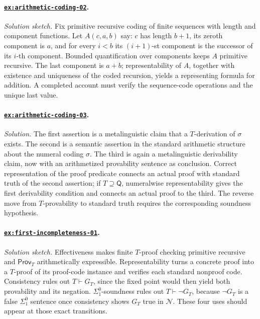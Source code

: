 \documentclass[11pt,oneside,openany]{book}
\theoremstyle{definition}
\theoremstyle{plain}
\theoremstyle{remark}
\newcommand{\derives}{\vdash}
\begin{document}
\paragraph{\hyperref[ex:arithmetic-coding-02]{\texttt{ex:arithmetic-coding-02}}.}
\textit{Solution sketch.}  Fix primitive recursive coding of finite sequences
with length and component functions.  Let \(A(c,a,b)\) say: \(c\) has length
\(b+1\), its zeroth component is \(a\), and for every \(i<b\) its
\((i+1)\)-st component is the successor of its \(i\)-th component.  Bounded
quantification over components keeps \(A\) primitive recursive.  The last
component is \(a+b\); representability of \(A\), together with existence and
uniqueness of the coded recursion, yields a representing formula for addition.
A completed account must verify the sequence-code operations and the unique
last value.

\paragraph{\hyperref[ex:arithmetic-coding-03]{\texttt{ex:arithmetic-coding-03}}.}
\textit{Solution.}  The first assertion is a metalinguistic claim that a
\(T\)-derivation of \(\sigma\) exists.  The second is a semantic assertion in
the standard arithmetic structure about the numeral coding \(\sigma\).  The
third is again a metalinguistic derivability claim, now with an arithmetized
provability sentence as conclusion.  Correct representation of the proof
predicate connects an actual proof with standard truth of the second assertion;
if \(T\supseteq\mathsf Q\), numeralwise representability gives the first
derivability condition and connects an actual proof to the third.  The reverse
move from \(T\)-provability to standard truth requires the corresponding
soundness hypothesis.

\paragraph{\hyperref[ex:first-incompleteness-01]{\texttt{ex:first-incompleteness-01}}.}
\textit{Solution sketch.}  Effectiveness makes finite \(T\)-proof checking
primitive recursive and \(\mathsf{Prov}_T\) arithmetically expressible.
Representability turns a concrete proof into a \(T\)-proof of its proof-code
instance and verifies each standard nonproof code.  Consistency rules out
\(T\derives G_T\), since the fixed point would then yield both provability and
its negation.  \(\Sigma^0_1\)-soundness rules out
\(T\derives\neg G_T\), because \(\neg G_T\) is a false
\(\Sigma^0_1\) sentence once consistency shows \(G_T\) true in
\(\mathcal N\).  These four uses should appear at those exact transitions.
\end{document}
